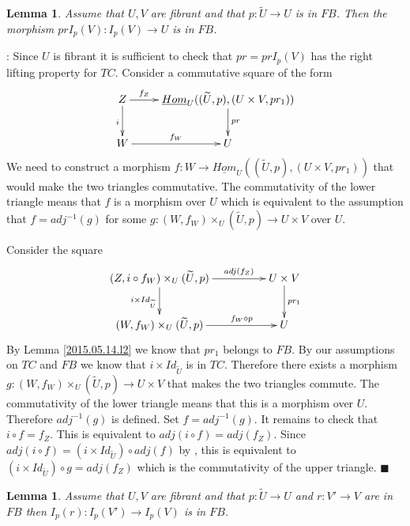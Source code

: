 \documentclass[12pt]{article}
\numberwithin{equation}{section}
\newenvironment{myproof}{{\bf Proof}:}{$\blacksquare$ \vskip 5mm }
\newtheorem{lemma}[proposition]{Lemma}
\newcommand{\llabel}[1]{\label{#1}}
\newcommand{\sr}{\rightarrow}
\newcommand{\uu}{\underline}
\newcommand{\wt}{\widetilde}
\newcommand{\dd}{\diamond}
\begin{document}
%
\begin{lemma}
\llabel{2015.05.14.l1} Assume that $U,V$ are fibrant and that $p:\wt{U}\sr U$
is in $FB$. Then the morphism $prI_p(V):I_p(V)\sr U$ is in $FB$.
\end{lemma}
%
\begin{myproof}
Since $U$ is fibrant it is sufficient to check that $pr=prI_p(V)$ has the right
lifting property for $TC$. Consider a commutative square of the form
%
$$
\begin{xy}
          \xymatrix@C=2pc{ Z \ar[r]^-{f_Z} \ar[d]_{i} &
            \uu{Hom}_U((\wt{U},p),(U\times V,pr_1)) \ar[d]^{pr}\\ W
            \ar[r]^-{f_W} & U }
\end{xy}
$$
%
We need to construct a morphism $f:W\sr \uu{Hom}_U((\wt{U},p),(U\times
V,pr_1))$ that would make the two triangles commutative. The commutativity of
the lower triangle means that $f$ is a morphism over $U$ which is equivalent to
the assumption that $f=adj^{-1}(g)$ for some $g:(W,f_W)\times_U (\wt{U},p)\sr
U\times V$ over $U$.

Consider the square
%
$$
\begin{xy}
          \xymatrix@C=4pc{ (Z, i\circ f_W)\times_U (\wt{U},p)
            \ar[r]^-{adj(f_Z)} \ar[d]_{i\times Id_{\wt{U}}} & U\times V
            \ar[d]^{pr_1}\\ (W,f_W)\times_U (\wt{U},p) \ar[r]^-{f_W\dd p} & U }
\end{xy}
$$
%
By Lemma \ref{2015.05.14.l2} we know that $pr_1$ belongs to $FB$. By our
assumptions on $TC$ and $FB$ we know that $i\times Id_{\wt{U}}$ is in
$TC$. Therefore there exists a morphism $g:(W,f_W)\times_U (\wt{U},p) \sr
U\times V$ that makes the two triangles commute.  The commutativity of the
lower triangle means that this is a morphism over $U$. Therefore $adj^{-1}(g)$
is defined. Set $f=adj^{-1}(g)$. It remains to check that $i\circ f=f_Z$. This
is equivalent to $adj(i\circ f)=adj(f_Z)$. Since $adj(i\circ f)=(i\times
Id_{\wt{U}})\circ adj(f)$ by \cite[Lemma 8.7(3)]{fromunivwithPi}, this is
equivalent to $(i\times Id_{\wt{U}})\circ g=adj(f_Z)$ which is the
commutativity of the upper triangle.
\end{myproof}
%
\begin{lemma}
\llabel{2015.05.14.l3} Assume that $U,V$ are fibrant and that $p:\wt{U}\sr U$
and $r:V'\sr V$ are in $FB$ then $I_p(r):I_p(V')\sr I_p(V)$ is in $FB$.
\end{lemma}
%
\end{document}
